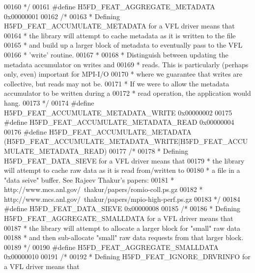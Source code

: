 \begin{DoxyCode}
00160 \textcolor{comment}{     */}
00161 \textcolor{preprocessor}{#define H5FD\_FEAT\_AGGREGATE\_METADATA    0x00000001}
00162     \textcolor{comment}{/*}
00163 \textcolor{comment}{     * Defining H5FD\_FEAT\_ACCUMULATE\_METADATA for a VFL driver means that}
00164 \textcolor{comment}{     * the library will attempt to cache metadata as it is written to the file}
00165 \textcolor{comment}{     * and build up a larger block of metadata to eventually pass to the VFL}
00166 \textcolor{comment}{     * 'write' routine.}
00167 \textcolor{comment}{     *}
00168 \textcolor{comment}{     * Distinguish between updating the metadata accumulator on writes and}
00169 \textcolor{comment}{     * reads.  This is particularly (perhaps only, even) important for MPI-I/O}
00170 \textcolor{comment}{     * where we guarantee that writes are collective, but reads may not be.}
00171 \textcolor{comment}{     * If we were to allow the metadata accumulator to be written during a}
00172 \textcolor{comment}{     * read operation, the application would hang.}
00173 \textcolor{comment}{     */}
00174 \textcolor{preprocessor}{#define H5FD\_FEAT\_ACCUMULATE\_METADATA\_WRITE     0x00000002}
00175 \textcolor{preprocessor}{#define H5FD\_FEAT\_ACCUMULATE\_METADATA\_READ      0x00000004}
00176 \textcolor{preprocessor}{#define H5FD\_FEAT\_ACCUMULATE\_METADATA  
       (H5FD\_FEAT\_ACCUMULATE\_METADATA\_WRITE|H5FD\_FEAT\_ACCUMULATE\_METADATA\_READ)}
00177     \textcolor{comment}{/*}
00178 \textcolor{comment}{     * Defining H5FD\_FEAT\_DATA\_SIEVE for a VFL driver means that}
00179 \textcolor{comment}{     * the library will attempt to cache raw data as it is read from/written to}
00180 \textcolor{comment}{     * a file in a "data seive" buffer.  See Rajeev Thakur's papers:}
00181 \textcolor{comment}{     *  http://www.mcs.anl.gov/~thakur/papers/romio-coll.ps.gz}
00182 \textcolor{comment}{     *  http://www.mcs.anl.gov/~thakur/papers/mpio-high-perf.ps.gz}
00183 \textcolor{comment}{     */}
00184 \textcolor{preprocessor}{#define H5FD\_FEAT\_DATA\_SIEVE            0x00000008}
00185     \textcolor{comment}{/*}
00186 \textcolor{comment}{     * Defining H5FD\_FEAT\_AGGREGATE\_SMALLDATA for a VFL driver means that}
00187 \textcolor{comment}{     * the library will attempt to allocate a larger block for "small" raw data}
00188 \textcolor{comment}{     * and then sub-allocate "small" raw data requests from that larger block.}
00189 \textcolor{comment}{     */}
00190 \textcolor{preprocessor}{#define H5FD\_FEAT\_AGGREGATE\_SMALLDATA   0x00000010}
00191     \textcolor{comment}{/*}
00192 \textcolor{comment}{     * Defining H5FD\_FEAT\_IGNORE\_DRVRINFO for a VFL driver means that}

\end{DoxyCode}
